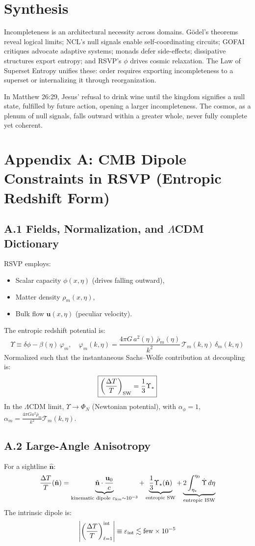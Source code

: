 \documentclass{article}
\begin{document}
{{\section{Synthesis}
\label{sec:synthesis}
Incompleteness is an architectural necessity across domains. G\"{o}del's theorems reveal logical limits; NCL's null signals enable self-coordinating circuits; GOFAI critiques advocate adaptive systems; monads defer side-effects; dissipative structures export entropy; and RSVP's \(\phi\) drives cosmic relaxation. The Law of Superset Entropy unifies these: order requires exporting incompleteness to a superset or internalizing it through reorganization.

In Matthew 26:29, Jesus' refusal to drink wine until the kingdom signifies a null state, fulfilled by future action, opening a larger incompleteness. The cosmos, as a plenum of null signals, falls outward within a greater whole, never fully complete yet coherent.

\section{Appendix A: CMB Dipole Constraints in RSVP (Entropic Redshift Form)}
\subsection{A.1 Fields, Normalization, and \texorpdfstring{\(\Lambda\)}{Lambda}CDM Dictionary}
RSVP employs:
\begin{itemize}
    \item Scalar capacity \(\phi(x,\eta)\) (drives falling outward),
    \item Matter density \(\rho_m(x,\eta)\),
    \item Bulk flow \(\mathbf{u}(x,\eta)\) (peculiar velocity).
\end{itemize}
The entropic redshift potential is:
\[
\boxed{\Upsilon \equiv \delta\phi - \beta(\eta)\,\varphi_m, \quad \varphi_m(k,\eta) = \frac{4\pi G\,a^2(\eta)\,\bar{\rho}_m(\eta)}{k^2}\,\mathcal{T}_m(k,\eta)\,\delta_m(k,\eta)}
\]
Normalized such that the instantaneous Sachs--Wolfe contribution at decoupling is:
\[
\boxed{\left(\frac{\Delta T}{T}\right)_{\rm SW} = \frac{1}{3}\Upsilon_*}
\]
In the \texorpdfstring{\(\Lambda\)}{Lambda}CDM limit, \(\Upsilon \to \Phi_N\) (Newtonian potential), with \(\alpha_\phi = 1\), \(\alpha_m = \frac{4\pi G a^2 \bar{\rho}_m}{k^2} \mathcal{T}_m(k,\eta)\).

\subsection{A.2 Large-Angle Anisotropy}
For a sightline \(\hat{\mathbf{n}}\):
\[
\frac{\Delta T}{T}(\hat{\mathbf{n}}) = \underbrace{\hat{\mathbf{n}} \cdot \frac{\mathbf{u}_0}{c}}_{\text{kinematic dipole } \varepsilon_{\rm kin} \sim 10^{-3}} + \underbrace{\frac{1}{3}\Upsilon_*(\hat{\mathbf{n}})}_{\text{entropic SW}} + \underbrace{2 \int_{\eta_*}^{\eta_0} \dot{\Upsilon} \, d\eta}_{\text{entropic ISW}}
\]
The intrinsic dipole is:
\[
\left| \left( \frac{\Delta T}{T} \right)_{\ell=1}^{\rm int} \right| \equiv \varepsilon_{\rm int} \lesssim \text{few} \times 10^{-5}
\]

}}
\end{document}
